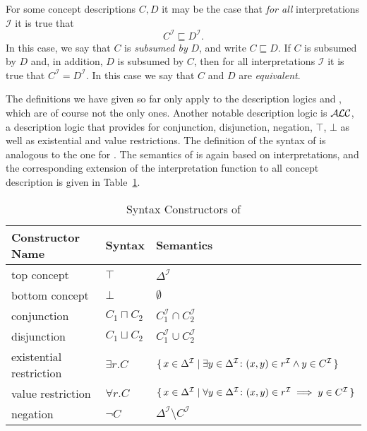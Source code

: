 For some \ELbot concept descriptions $C, D$ it may be the case that \emph{for all}
interpretations $\mathcal{I}$ it is true that
\begin{equation*}
  C^{\mathcal{I}} \sqsubseteq D^{\mathcal{I}}.
\end{equation*}
In this case, we say that $C$ is \emph{subsumed by} $D$, and write $C \sqsubseteq D$.  If
$C$ is subsumed by $D$ and, in addition, $D$ is subsumed by $C$, then for all
interpretations $\mathcal{I}$ it is true that $C^{\mathcal{I}} = D^{\mathcal{I}}$.  In
this case we say that $C$ and $D$ are \emph{equivalent}.

The definitions we have given so far only apply to the description logics \EL and \ELbot,
which are of course not the only ones.  Another notable description logic is $\mathcal{A}\kern-0.05em\mathcal{L}\mathcal{C}$, a
description logic that provides for conjunction, disjunction, negation, $\top$, $\bot$ as
well as existential and value restrictions.  The definition of the syntax of \ALC is
analogous to the one for \EL.  The semantics of \ALC is again based on interpretations,
and the corresponding extension of the interpretation function to all \ALC concept
description is given in Table~\ref{tab:ALC-syntax}.

\begin{table}[tp]
  \centering
  \renewcommand{\arraystretch}{1.2}
  \begin{tabular}[c]{l l l}
    \toprule
    Constructor Name         & Syntax           & Semantics \\
    \midrule
    top concept              & $\top$           & $\Delta^{\mathcal{I}}$ \\
    bottom concept           & $\bot$           & $\emptyset$ \\
    conjunction              & $C_1 \sqcap C_2$ & $C_1^{\mathcal{I}} \cap C_2^{\mathcal{I}}$ \\
    disjunction              & $C_1 \sqcup C_2$ & $C_1^{\mathcal{I}} \cup C_2^{\mathcal{I}}$ \\
    existential restriction  & $\exists r. C$   & ${\{\, x \in \Delta^{\mathcal{I}} \mid
      \exists y \in \Delta^{\mathcal{I}} \colon (x, y) \in r^{\mathcal{I}} \land y \in
      C^{\mathcal{I}} \,\}}$ \\
    value restriction        & $\forall r. C$   & ${\{\, x \in \Delta^{\mathcal{I}} \mid
      \forall y \in \Delta^{\mathcal{I}} \colon (x, y) \in r^{\mathcal{I}} \implies y \in
      C^{\mathcal{I}} \,\}}$ \\
    negation                 & $\neg C$         & $\Delta^{\mathcal{I}} \setminus
    C^{\mathcal{I}}$ \\
    \bottomrule
  \end{tabular}
  \caption{Syntax Constructors of \ALC}
  \label{tab:ALC-syntax}
\end{table}

